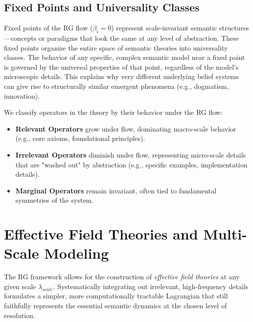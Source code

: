 
\subsection{Fixed Points and Universality Classes}
\label{15.3.1:fixed_points_and_universality_classes}

Fixed points of the RG flow (\(\beta_i = 0\)) represent scale-invariant semantic structures—concepts or paradigms that look the same at any level of abstraction. These fixed points organize the entire space of semantic theories into universality classes. The behavior of any specific, complex semantic model near a fixed point is governed by the universal properties of that point, regardless of the model's microscopic details. This explains why very different underlying belief systems can give rise to structurally similar emergent phenomena (e.g., dogmatism, innovation).

We classify operators in the theory by their behavior under the RG flow:

\begin{itemize}

    \item \textbf{Relevant Operators} grow under flow, dominating macro-scale behavior (e.g., core axioms, foundational principles).

    \item \textbf{Irrelevant Operators} diminish under flow, representing micro-scale details that are "washed out" by abstraction (e.g., specific examples, implementation details).

    \item \textbf{Marginal Operators} remain invariant, often tied to fundamental symmetries of the system.

\end{itemize}


\section{Effective Field Theories and Multi-Scale Modeling}
\label{15.4:effective_field_theories_and_multi_scale_modeling}

The RG framework allows for the construction of \textit{effective field theories} at any given scale \(\lambda_{scale}\). Systematically integrating out irrelevant, high-frequency details formulates a simpler, more computationally tractable Lagrangian that still faithfully represents the essential semantic dynamics at the chosen level of resolution.

